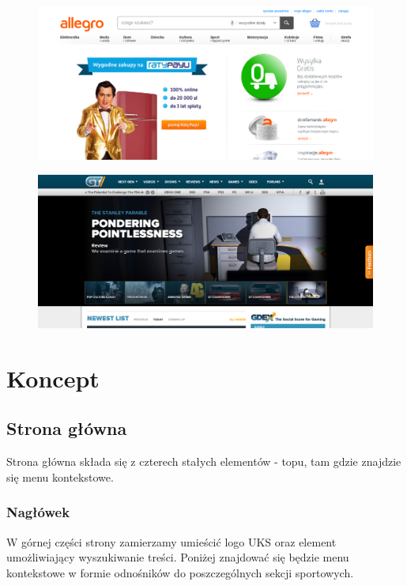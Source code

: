 \documentclass{scrartcl}
\begin{document}
\begin{figure}
  \centering
  \includegraphics[width=1\linewidth]{TCN4mWO.png}
  \label{fig:test1}
\end{figure}
\begin{figure}
  \centering
  \includegraphics[width=1\linewidth]{vTHA7wq.png}
  \label{fig:test2}
\end{figure}

\section{Koncept}
\subsection{Strona główna}
Strona główna składa się z czterech stałych elementów - topu, tam gdzie znajdzie się menu kontekstowe.
\subsubsection{Nagłówek}
W górnej części strony zamierzamy umieścić logo UKS oraz element umożliwiający wyszukiwanie treści. Poniżej znajdować się będzie menu kontekstowe w formie odnośników do poszczególnych sekcji sportowych.
\end{document}
